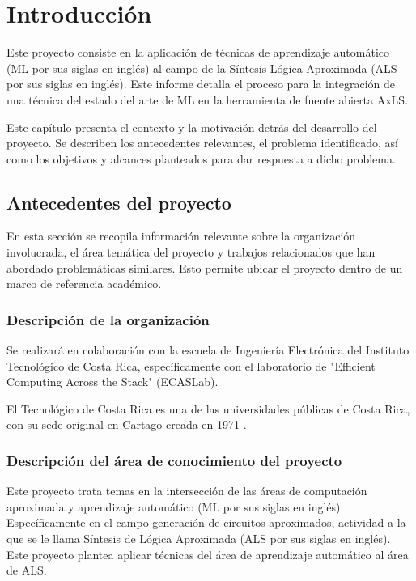 \chapter{Introducción}

Este proyecto consiste en la aplicación de técnicas de aprendizaje automático
(ML por sus siglas en inglés) al campo de la Síntesis Lógica Aproximada (ALS
por sus siglas en inglés).
Este informe detalla el proceso para la integración de una técnica del estado del
arte de ML en la herramienta de fuente abierta AxLS.

Este capítulo presenta el contexto y la motivación detrás del desarrollo del
proyecto. Se describen los antecedentes relevantes, el problema identificado,
así como los objetivos y alcances planteados para dar respuesta a dicho
problema.

\section{Antecedentes del proyecto}

En esta sección se recopila información relevante sobre la organización
involucrada, el área temática del proyecto y trabajos relacionados que han
abordado problemáticas similares. Esto permite ubicar el proyecto dentro de un
marco de referencia académico.

\subsection{Descripción de la organización}

Se realizará en colaboración con la escuela de Ingeniería Electrónica del
Instituto Tecnológico de Costa Rica, específicamente con el laboratorio de
"Efficient Computing Across the Stack" (ECASLab).

El Tecnológico de Costa Rica es una de las universidades públicas de Costa
Rica, con su sede original en Cartago creada en 1971 \cite{resena_tec}.

\subsection{Descripción del área de conocimiento del proyecto}

Este proyecto trata temas en la intersección de las áreas de computación
aproximada y aprendizaje automático (ML por sus siglas en inglés).
Específicamente en el campo generación de circuitos aproximados, actividad a la
que se le llama Síntesis de Lógica Aproximada (ALS por sus siglas en inglés).
Este proyecto plantea aplicar técnicas del área de aprendizaje automático al
área de ALS.

